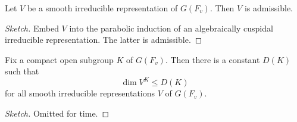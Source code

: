 \documentclass{article}
\begin{document}
\begin{corollary}
	Let $V$ be a smooth irreducible representation of $G(F_v)$. Then $V$ is admissible.
\end{corollary}
\begin{proof}[Sketch]
	Embed $V$ into the parabolic induction of an algebraically cuspidal irreducible representation. The latter is admissible.
\end{proof}
\begin{theorem}
	Fix a compact open subgroup $K$ of $G(F_v)$. Then there is a constant $D(K)$ such that
	\[\dim V^K\le D(K)\]
	for all smooth irreducible representations $V$ of $G(F_v)$.
\end{theorem}
\begin{proof}[Sketch]
	Omitted for time.\todo{}
\end{proof}
\end{document}
